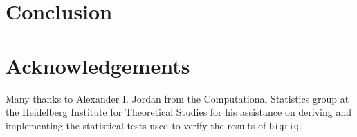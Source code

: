 \documentclass[a4paper]{article}
\newcommand{\bigrig}{\texttt{bigrig}}
\begin{document}
\section{Conclusion}

\section{Acknowledgements}

Many thanks to Alexander I. Jordan from the Computational Statistics group at the Heidelberg Institute for Theoretical Studies for his assistance on deriving and
implementing the statistical tests used to verify the results of \bigrig{}.


\end{document}
